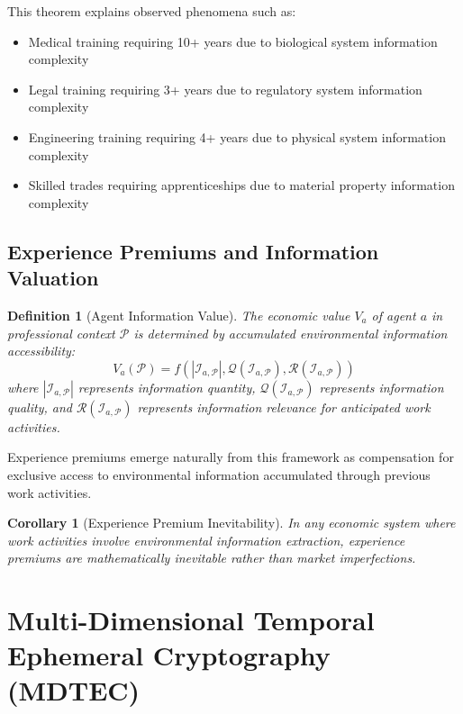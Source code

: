 \documentclass[12pt,a4paper]{article}
\newtheorem{corollary}[theorem]{Corollary}
\newtheorem{definition}[theorem]{Definition}
\begin{document}
This theorem explains observed phenomena such as:
\begin{itemize}
\item Medical training requiring 10+ years due to biological system information complexity
\item Legal training requiring 3+ years due to regulatory system information complexity  
\item Engineering training requiring 4+ years due to physical system information complexity
\item Skilled trades requiring apprenticeships due to material property information complexity
\end{itemize}

\subsection{Experience Premiums and Information Valuation}

\begin{definition}[Agent Information Value]
The economic value $V_a$ of agent $a$ in professional context $\mathcal{P}$ is determined by accumulated environmental information accessibility:
\begin{equation}
V_a(\mathcal{P}) = f\left(\left|\mathcal{I}_{a,\mathcal{P}}\right|, \mathcal{Q}(\mathcal{I}_{a,\mathcal{P}}), \mathcal{R}(\mathcal{I}_{a,\mathcal{P}})\right)
\end{equation}
where $|\mathcal{I}_{a,\mathcal{P}}|$ represents information quantity, $\mathcal{Q}(\mathcal{I}_{a,\mathcal{P}})$ represents information quality, and $\mathcal{R}(\mathcal{I}_{a,\mathcal{P}})$ represents information relevance for anticipated work activities.
\end{definition}

Experience premiums emerge naturally from this framework as compensation for exclusive access to environmental information accumulated through previous work activities.

\begin{corollary}[Experience Premium Inevitability]
In any economic system where work activities involve environmental information extraction, experience premiums are mathematically inevitable rather than market imperfections.
\end{corollary}

\section{Multi-Dimensional Temporal Ephemeral Cryptography (MDTEC)}
\end{document}
